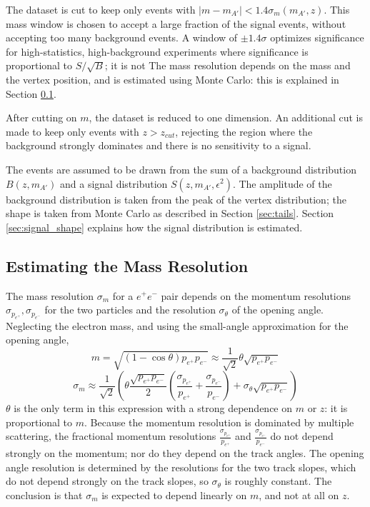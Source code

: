 The dataset is cut to keep only events with $|m-m_{A'}|<1.4 \sigma_m(m_{A'},z)$.
This mass window is chosen to accept a large fraction of the signal events, without accepting too many background events.
A window of $\pm1.4\sigma$ optimizes significance for high-statistics, high-background experiments where significance is proportional to $S/\sqrt{B}$; it is not 
The mass resolution depends on the mass and the vertex position, and is estimated using Monte Carlo: this is explained in Section \ref{sec:mres}.

After cutting on $m$, the dataset is reduced to one dimension.
An additional cut is made to keep only events with $z>z_{cut}$, rejecting the region where the background strongly dominates and there is no sensitivity to a signal.

The events are assumed to be drawn from the sum of a background distribution $B(z,m_{A'})$ and a signal distribution $S(z,m_{A'},\epsilon^2)$.
The amplitude of the background distribution is taken from the peak of the vertex distribution; the shape is taken from Monte Carlo as described in Section \ref{sec:tails}.
Section \ref{sec:signal_shape} explains how the signal distribution is estimated.

\subsection{Estimating the Mass Resolution}
\label{sec:mres}

The mass resolution $\sigma_m$ for a $e^+e^-$ pair depends on the momentum resolutions $\sigma_{p_{e^+}},\sigma_{p_{e^-}}$ for the two particles and the resolution $\sigma_\theta$ of the opening angle.
Neglecting the electron mass, and using the small-angle approximation for the opening angle,
\begin{equation}
m=\sqrt{(1-\cos\theta)p_{e^+}p_{e^-}} \approx \frac{1}{\sqrt{2}}\theta\sqrt{p_{e^+}p_{e^-}}
\end{equation}
\begin{equation}
\sigma_m\approx \frac{1}{\sqrt{2}}\left(\theta \frac{\sqrt{p_{e^+}p_{e^-}}}{2}\left(\frac{\sigma_{p_{e^+}}}{p_{e^+}}+\frac{\sigma_{p_{e^-}}}{p_{e^-}}\right)  + \sigma_\theta\sqrt{p_{e^+}p_{e^-}} \right)
\end{equation}
$\theta$ is the only term in this expression with a strong dependence on $m$ or $z$: it is proportional to $m$.
Because the momentum resolution is dominated by multiple scattering, the fractional momentum resolutions $\frac{\sigma_{p_{e^+}}}{p_{e^+}}$ and $\frac{\sigma_{p_{e^-}}}{p_{e^-}}$ do not depend strongly on the momentum; nor do they depend on the track angles.
The opening angle resolution is determined by the resolutions for the two track slopes, which do not depend strongly on the track slopes, so $\sigma_\theta$ is roughly constant.
The conclusion is that $\sigma_m$ is expected to depend linearly on $m$, and not at all on $z$.

